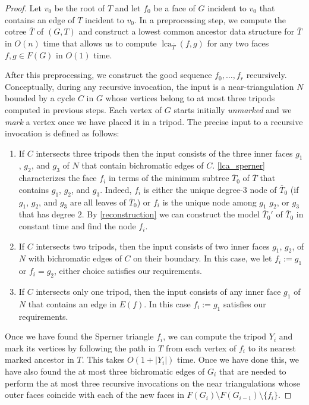 \documentclass{patmorin}
\DeclareMathOperator{\lca}{lca}
\begin{document}
\begin{proof}
  Let $v_0$ be the root of $T$ and let $f_0$ be a face of $G$ incident to $v_0$
  that contains an edge of $T$ incident to $v_0$.  In a preprocessing step, we compute the cotree $\overline{T}$ of $(G,T)$ and construct a lowest common ancestor data structure for $\overline{T}$ in $O(n)$ time that allows us to compute $\lca_{\overline{T}}(f,g)$ for any two faces $f,g\in F(G)$ in $O(1)$ time.

  After this preprocessing, we construct the good sequence $f_0,\ldots,f_{r}$ recursively. Conceptually, during any recursive invocation, the input is a near-triangulation $N$ bounded by a cycle $C$ in $G$ whose vertices belong to at most three tripods computed in previous steps.  Each vertex of $G$ starts initially \emph{unmarked} and we \emph{mark} a vertex once we have placed it in a tripod.  The precise input to a recursive invocation is defined as follows:
  \begin{enumerate}
    \item If $C$ intersects three tripods then the input consists of the three inner faces $g_1$, $g_2$, and $g_3$ of $N$ that contain bichromatic edges of $C$.  \cref{lca_sperner} characterizes the face $f_i$ in terms of the minimum subtree $\overline{T}_0$ of $\overline{T}$ that contains $g_1$, $g_2$, and $g_3$.  Indeed, $f_i$ is either the unique degree-$3$ node of $\overline{T}_0$ (if $g_1$, $g_2$, and $g_3$ are all leaves of $\overline{T}_0$) or $f_i$ is the unique node among $g_1$ $g_2$, or $g_3$ that has degree $2$.  By \cref{reconstruction} we can construct the model $\overline{T}_0'$ of $\overline{T}_0$ in constant time and find the node $f_i$.

    \item If $C$ intersects two tripods, then the input consists of two inner faces $g_1$, $g_2$, of $N$ with bichromatic edges of $C$ on their boundary.  In this case, we let $f_i:=g_1$ or $f_i=g_2$, either choice satisfies our requirements.

    \item If $C$ intersects only one tripod, then the input consists of any inner face $g_1$ of $N$ that contains an edge in $E(f)$.  In this case $f_i:=g_1$ satisfies our requirements.
\end{enumerate}
Once we have found the Sperner triangle $f_i$, we can compute the tripod $Y_i$ and mark its vertices by following the path in $T$ from each vertex of $f_i$ to its nearest marked ancestor in $T$.  This takes $O(1+|Y_i|)$ time.  Once we have done this, we have also found the at most three bichromatic edges of $G_i$ that are needed to perform the at most three recursive invocations on the near triangulations whose outer faces coincide with each of the new faces in $F(G_i)\setminus F(G_{i-1})\setminus\{f_i\}$.


\end{proof}
\end{document}
